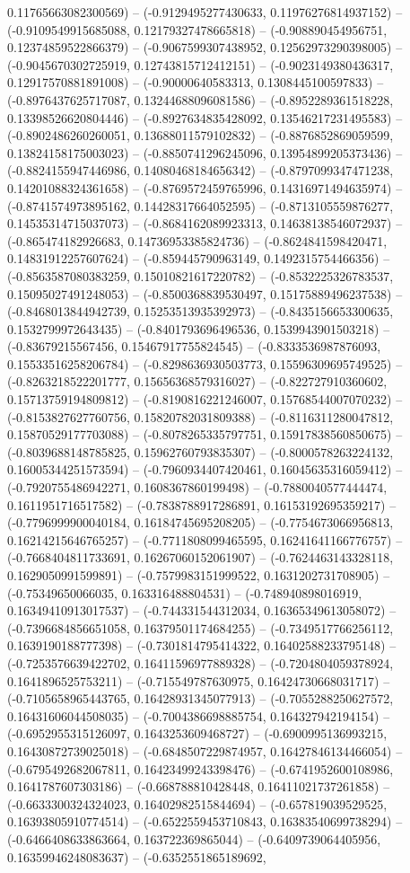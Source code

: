 0.11765663082300569) -- (-0.9129495277430633, 0.11976276814937152) -- (-0.9109549915685088, 0.12179327478665818) -- (-0.908890454956751, 0.12374859522866379) -- (-0.9067599307438952, 0.12562973290398005) -- (-0.9045670302725919, 0.12743815712412151) -- (-0.9023149380436317, 0.12917570881891008) -- (-0.90000640583313, 0.1308445100597833) -- (-0.8976437625717087, 0.13244688096081586) -- (-0.8952289361518228, 0.13398526620804446) -- (-0.8927634835428092, 0.13546217231495583) -- (-0.8902486260260051, 0.13688011579102832) -- (-0.8876852869059599, 0.13824158175003023) -- (-0.8850741296245096, 0.13954899205373436) -- (-0.8824155947446986, 0.14080468184656342) -- (-0.8797099347471238, 0.14201088324361658) -- (-0.8769572459765996, 0.14316971494635974) -- (-0.8741574973895162, 0.14428317664052595) -- (-0.8713105559876277, 0.14535314715037073) -- (-0.8684162089923313, 0.14638138546072937) -- (-0.865474182926683, 0.14736953385824736) -- (-0.8624841598420471, 0.14831912257607624) -- (-0.859445790963149, 0.1492315754466356) -- (-0.8563587080383259, 0.15010821617220782) -- (-0.8532225326783537, 0.15095027491248053) -- (-0.8500368839530497, 0.15175889496237538) -- (-0.8468013844942739, 0.15253513935392973) -- (-0.8435156653300635, 0.1532799972643435) -- (-0.8401793696496536, 0.1539943901503218) -- (-0.83679215567456, 0.15467917755824545) -- (-0.8333536987876093, 0.15533516258206784) -- (-0.8298636930503773, 0.15596309695749525) -- (-0.8263218522201777, 0.15656368579316027) -- (-0.822727910360602, 0.15713759194809812) -- (-0.8190816221246007, 0.15768544007070232) -- (-0.8153827627760756, 0.15820782031809388) -- (-0.8116311280047812, 0.15870529177703088) -- (-0.8078265335797751, 0.15917838560850675) -- (-0.8039688148785825, 0.15962760793835307) -- (-0.8000578263224132, 0.16005344251573594) -- (-0.7960934407420461, 0.16045635316059412) -- (-0.7920755486942271, 0.1608367860199498) -- (-0.7880040577444474, 0.1611951716517582) -- (-0.7838788917286891, 0.16153192695359217) -- (-0.7796999900040184, 0.16184745695208205) -- (-0.7754673066956813, 0.16214215646765257) -- (-0.7711808099465595, 0.16241641166776757) -- (-0.7668404811733691, 0.16267060152061907) -- (-0.7624463143328118, 0.1629050991599891) -- (-0.7579983151999522, 0.1631202731708905) -- (-0.75349650066035, 0.163316488804531) -- (-0.748940898016919, 0.16349410913017537) -- (-0.744331544312034, 0.16365349613058072) -- (-0.7396684856651058, 0.16379501174684255) -- (-0.7349517766256112, 0.1639190188777398) -- (-0.7301814795414322, 0.16402588233795148) -- (-0.7253576639422702, 0.16411596977889328) -- (-0.7204804059378924, 0.1641896525753211) -- (-0.715549787630975, 0.16424730668031717) -- (-0.7105658965443765, 0.16428931345077913) -- (-0.7055288250627572, 0.16431606044508035) -- (-0.7004386698885754, 0.164327942194154) -- (-0.6952955315126097, 0.1643253609468727) -- (-0.6900995136993215, 0.16430872739025018) -- (-0.6848507229874957, 0.16427846134466054) -- (-0.6795492682067811, 0.16423499243398476) -- (-0.6741952600108986, 0.1641787607303186) -- (-0.668788810428448, 0.16411021737261858) -- (-0.6633300324324023, 0.16402982515844694) -- (-0.657819039529525, 0.16393805910774514) -- (-0.6522559453710843, 0.16383540699738294) -- (-0.6466408633863664, 0.163722369865044) -- (-0.6409739064405956, 0.16359946248083637) -- (-0.6352551865189692, 